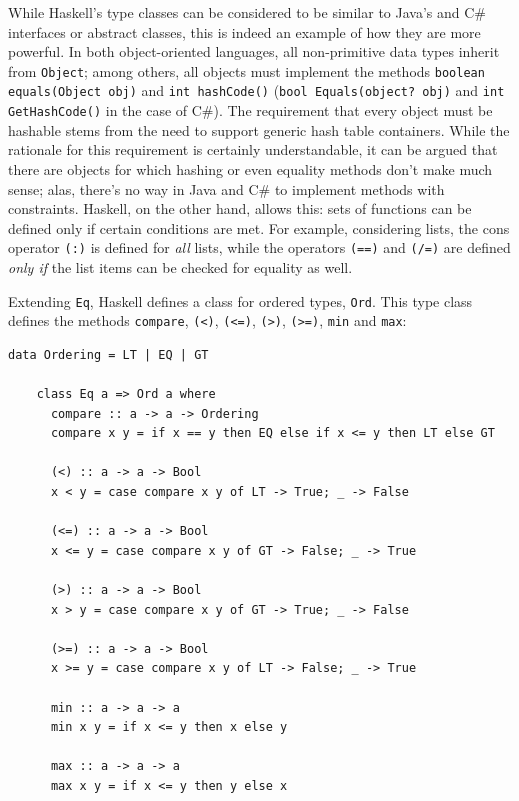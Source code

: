 \documentclass[UdineBachThesis,american,11pt]{PhdThesis}
\begin{document}
  While Haskell's type classes can be considered to be similar to Java's and C\#
  interfaces or abstract classes, this is indeed an example of how they are more
  powerful. In both object-oriented languages, all non-primitive data types
  inherit from \mbox{\texttt{Object}}; among others, all objects must implement
  the methods \mbox{\texttt{boolean equals(Object obj)}} and
  \mbox{\texttt{int hashCode()}} (\mbox{\texttt{bool Equals(object? obj)}} and
  \mbox{\texttt{int GetHashCode()}} in the case of C\#). The requirement that
  every object must be hashable stems from the need to support generic hash
  table containers. While the rationale for this requirement is certainly
  understandable, it can be argued that there are objects for which hashing or
  even equality methods don't make much sense; alas, there's no way in Java and
  C\# to implement methods with constraints. Haskell, on the other hand, allows
  this: sets of functions can be defined only if certain conditions are met. For
  example, considering lists, the cons operator \mbox{\texttt{(:)}} is defined
  for \emph{all} lists, while the operators \mbox{\texttt{(==)}} and
  \mbox{\texttt{(/=)}} are defined \emph{only if} the list items can be checked
  for equality as well.

  Extending \mbox{\texttt{Eq}}, Haskell defines a class for ordered types,
  \mbox{\texttt{Ord}}. This type class defines the methods
  \mbox{\texttt{compare}}, \mbox{\texttt{(<)}}, \mbox{\texttt{(<=)}},
  \mbox{\texttt{(>)}}, \mbox{\texttt{(>=)}}, \mbox{\texttt{min}} and
  \mbox{\texttt{max}}:

  \begin{Verbatim}[gobble=4,fontsize=\small]
    data Ordering = LT | EQ | GT

    class Eq a => Ord a where
      compare :: a -> a -> Ordering
      compare x y = if x == y then EQ else if x <= y then LT else GT

      (<) :: a -> a -> Bool
      x < y = case compare x y of LT -> True; _ -> False

      (<=) :: a -> a -> Bool
      x <= y = case compare x y of GT -> False; _ -> True

      (>) :: a -> a -> Bool
      x > y = case compare x y of GT -> True; _ -> False

      (>=) :: a -> a -> Bool
      x >= y = case compare x y of LT -> False; _ -> True

      min :: a -> a -> a
      min x y = if x <= y then x else y

      max :: a -> a -> a
      max x y = if x <= y then y else x
  \end{Verbatim}
\end{document}
